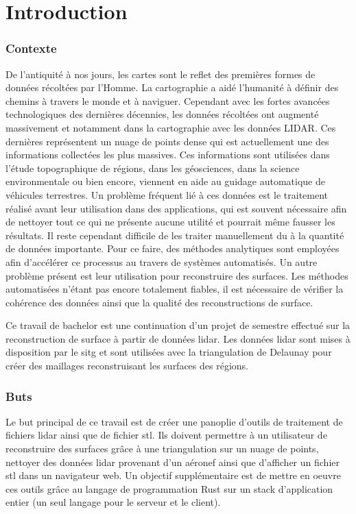 \chapter*{Introduction}
\subsection*{Contexte}
De l'antiquité à nos jours, les cartes sont le reflet des premières formes de données récoltées par l'Homme.
La cartographie a aidé l'humanité à définir des chemins à travers le monde et à naviguer.
Cependant avec les fortes avancées technologiques des dernières décennies,
les données récoltées ont augmenté massivement et notamment dans la cartographie avec les données LIDAR.
Ces dernières représentent un nuage de points dense qui est actuellement une des informations collectées les plus massives.
Ces informations sont utilisées dans l'étude topographique de régions, dans les géosciences,
dans la science environmentale ou bien encore, viennent en aide au guidage automatique de véhicules terrestres.
Un problème fréquent lié à ces données est le traitement réalisé avant leur
utilisation dans des applications, qui est souvent nécessaire afin de nettoyer
tout ce qui ne présente aucune utilité et pourrait même fausser les résultats.
Il reste cependant difficile de les traiter manuellement du à la quantité de données importante.
Pour ce faire, des méthodes analytiques sont employées afin d'accélérer ce processus au travers de systèmes automatisés.
Un autre problème présent est leur utilisation pour reconstruire des surfaces.
Les méthodes automatisées n'étant pas encore totalement fiables, il est nécessaire de
vérifier la cohérence des données ainsi que la qualité des reconstructions de
surface.

Ce travail de bachelor est une continuation d'un projet de semestre effectué sur
la reconstruction de surface à partir de données lidar. Les données lidar sont mises à disposition par le \gls{sitg} et sont utilisées
avec la triangulation de Delaunay pour créer des maillages reconstruisant les
surfaces des régions.

\subsection*{Buts}
Le but principal de ce travail est de créer une panoplie d'outils de traitement
de fichiers lidar ainsi que de fichier stl. Ils doivent permettre à un
utilisateur de reconstruire des surfaces grâce à une triangulation sur un nuage
de points, nettoyer des données lidar provenant d'un aéronef ainsi que
d'afficher un fichier stl dans un navigateur web. Un objectif supplémentaire est
de mettre en oeuvre ces outils grâce au langage de programmation Rust sur un
stack d'application entier (un seul langage pour le serveur et le client).


